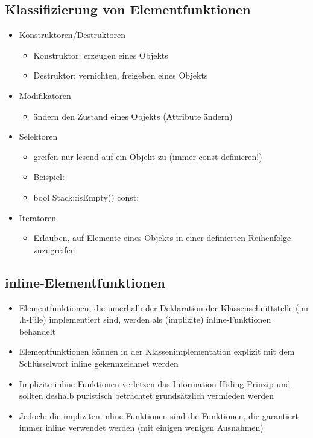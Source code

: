 \subsection{Klassifizierung von Elementfunktionen}
\label{sec:Klassifizierung von Elementfunktionen}
\begin{itemize}
	\item Konstruktoren/Destruktoren
	\begin{itemize}
		\item Konstruktor: erzeugen eines Objekts
		\item Destruktor: vernichten, freigeben eines Objekts
	\end{itemize}
	\item Modifikatoren
	\begin{itemize}
		\item ändern den Zustand eines Objekts (Attribute ändern)
	\end{itemize}
	\item Selektoren
	\begin{itemize}
		\item greifen nur lesend auf ein Objekt zu (immer const definieren!)
		\item Beispiel:
		\item[\-] bool Stack::isEmpty() const;
	\end{itemize}
	\item Iteratoren
	\begin{itemize}
		\item Erlauben, auf Elemente eines Objekts in einer definierten Reihenfolge zuzugreifen
	\end{itemize}
\end{itemize}

\subsection{inline-Elementfunktionen}
\label{sec:inline-Elementfunktionen}
\begin{itemize}
	\item Elementfunktionen, die innerhalb der Deklaration der Klassenschnittstelle (im .h-File) implementiert sind, werden als (implizite) inline-Funktionen behandelt
	\item Elementfunktionen können in der Klassenimplementation explizit mit dem Schlüsselwort inline gekennzeichnet werden
	\item \color{red} Implizite inline-Funktionen verletzen das Information Hiding Prinzip und sollten deshalb puristisch betrachtet grundsätzlich vermieden werden\color{black}
	\item \color{green} Jedoch: die impliziten inline-Funktionen sind die Funktionen, die garantiert immer inline verwendet werden (mit einigen wenigen Ausnahmen)
\end{itemize}

